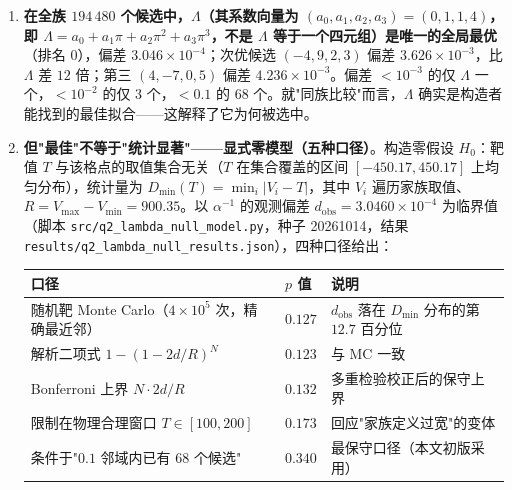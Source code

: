 \documentclass[12pt,a4paper]{article}
\begin{document}
\begin{enumerate}
  \item \textbf{在全族 $194\,480$ 个候选中，$\Lambda$（其系数向量为 $(a_0,a_1,a_2,a_3)=(0,1,1,4)$，即 $\Lambda=a_0+a_1\pi+a_2\pi^2+a_3\pi^3$，不是 $\Lambda$ 等于一个四元组）是唯一的全局最优}（排名 0），偏差 $3.046\times10^{-4}$；次优候选 $(-4,9,2,3)$ 偏差 $3.626\times10^{-3}$，比 $\Lambda$ 差 $12$ 倍；第三 $(4,-7,0,5)$ 偏差 $4.236\times10^{-3}$。偏差 $<10^{-3}$ 的仅 $\Lambda$ 一个，$<10^{-2}$ 的仅 3 个，$<0.1$ 的 68 个。就"同族比较"而言，$\Lambda$ 确实是构造者能找到的最佳拟合——这解释了它为何被选中。
  \item \textbf{但"最佳"不等于"统计显著"——显式零模型（五种口径）}。构造零假设 $H_0$：靶值 $T$ 与该格点的取值集合无关（$T$ 在集合覆盖的区间 $[-450.17, 450.17]$ 上均匀分布），统计量为 $D_{\min}(T)=\min_i |V_i - T|$，其中 $V_i$ 遍历家族取值、$R=V_{\max}-V_{\min}=900.35$。以 $\alpha^{-1}$ 的观测偏差 $d_{\text{obs}} = 3.0460\times10^{-4}$ 为临界值（脚本 \texttt{src/q2\_\allowbreak{}lambda\_\allowbreak{}null\_\allowbreak{}model.py}，种子 20261014，结果 \texttt{results/q2\_\allowbreak{}lambda\_\allowbreak{}null\_\allowbreak{}results.json}），四种口径给出：
  \begin{center}
  \footnotesize
  \begin{tabular}{@{}lll@{}}
  \toprule
  \textbf{口径} & \textbf{$p$ 值} & \textbf{说明} \\
  \midrule
  随机靶 Monte Carlo（$4\times10^5$ 次，精确最近邻） & $0.127$ & $d_{\text{obs}}$ 落在 $D_{\min}$ 分布的第 $12.7$ 百分位 \\
  解析二项式 $1-(1-2d/R)^N$ & $0.123$ & 与 MC 一致 \\
  Bonferroni 上界 $N\cdot 2d/R$ & $0.132$ & 多重检验校正后的保守上界 \\
  限制在物理合理窗口 $T\in[100,200]$ & $0.173$ & 回应"家族定义过宽"的变体 \\
  条件于"$0.1$ 邻域内已有 68 个候选" & $0.340$ & 最保守口径（本文初版采用） \\
  \bottomrule
  \end{tabular}
  \end{center}

\end{enumerate}
\end{document}
